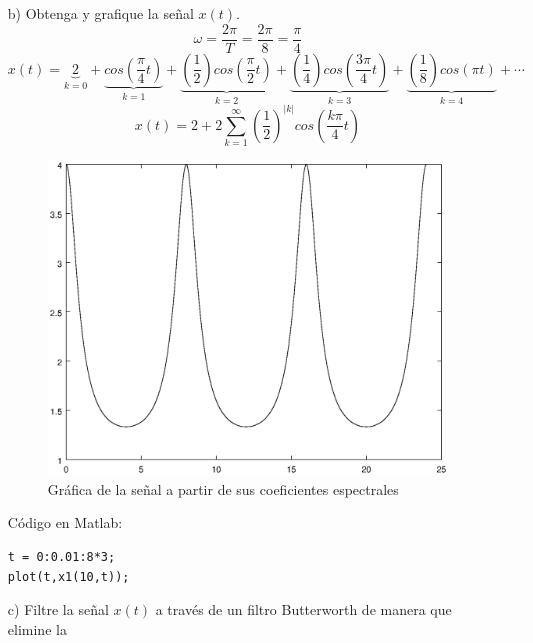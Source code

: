 \documentclass[a4paper,12pt]{article}
\begin{document}
\begin{itemize}
        \item[b)] Obtenga y grafique la señal $x(t)$.
        \[ \omega = \frac{2\pi}{T} = \frac{2\pi}{8} = \frac{\pi}{4} \]
        \[ x(t) = \underbrace{2}_{k=0} + 
                    \underbrace{cos\left(\frac{\pi}{4}t\right)}_{k=1} + 
                    \underbrace{\left(\frac{1}{2}\right)cos\left(\frac{\pi}{2}t\right)}_{k=2} +
                    \underbrace{\left(\frac{1}{4}\right)cos\left(\frac{3\pi}{4}t\right)}_{k=3} + 
                    \underbrace{\left(\frac{1}{8}\right)cos\left(\pi t\right)}_{k=4} + \cdots \]
        \[ x(t) = 2 + 2\sum_{k=1}^{\infty}\left(\frac{1}{2}\right)^{|k|}cos\left(\frac{k\pi}{4}t\right) \]
        \begin{multicols}{2}
            \begin{figure}[H]
                \begin{center}
                    \includegraphics[width=\linewidth]{x1}
                    \caption{Gráfica de la señal a partir de sus coeficientes espectrales}
                    \label{fig:x1}
                \end{center}
            \end{figure}
        \columnbreak
        Código en Matlab:
        
            \begin{lstlisting}
t = 0:0.01:8*3;
plot(t,x1(10,t));
            \end{lstlisting}
        \end{multicols}
        \item[c)] Filtre la señal $x(t)$ a través de un filtro Butterworth de manera que elimine la

\end{itemize}
\end{document}
